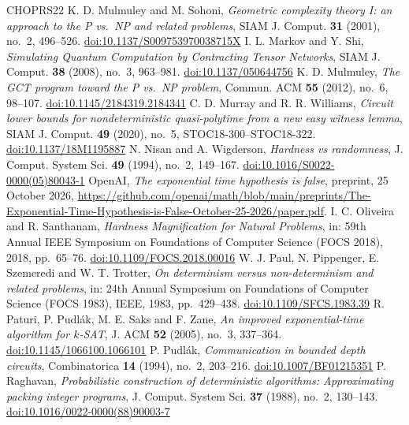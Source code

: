 \documentclass[11pt,reqno]{amsart}
\numberwithin{equation}{section}
\theoremstyle{plain}
\theoremstyle{definition}
\theoremstyle{remark}
\begin{document}
\begin{thebibliography}{CHOPRS22}
 K. D. Mulmuley and M. Sohoni, \emph{Geometric complexity theory I: an approach to the P vs.\ NP and related problems}, SIAM J. Comput. \textbf{31} (2001), no.~2, 496--526. \href{https://doi.org/10.1137/S009753970038715X}{doi:10.1137/S009753970038715X}
 I. L. Markov and Y. Shi, \emph{Simulating Quantum Computation by Contracting Tensor Networks}, SIAM J. Comput. \textbf{38} (2008), no.~3, 963--981. \href{https://doi.org/10.1137/050644756}{doi:10.1137/050644756}
 K. D. Mulmuley, \emph{The GCT program toward the P vs.\ NP problem}, Commun. ACM \textbf{55} (2012), no.~6, 98--107. \href{https://doi.org/10.1145/2184319.2184341}{doi:10.1145/2184319.2184341}
 C. D. Murray and R. R. Williams, \emph{Circuit lower bounds for nondeterministic quasi-polytime from a new easy witness lemma}, SIAM J. Comput. \textbf{49} (2020), no.~5, STOC18-300--STOC18-322. \href{https://doi.org/10.1137/18M1195887}{doi:10.1137/18M1195887}
 N. Nisan and A. Wigderson, \emph{Hardness vs randomness}, J. Comput. System Sci. \textbf{49} (1994), no.~2, 149--167. \href{https://doi.org/10.1016/S0022-0000(05)80043-1}{doi:10.1016/S0022-0000(05)80043-1}
 OpenAI, \emph{The exponential time hypothesis is false}, preprint, 25 October 2026, \url{https://github.com/openai/math/blob/main/preprints/The-Exponential-Time-Hypothesis-is-False-October-25-2026/paper.pdf}.
 I. C. Oliveira and R. Santhanam, \emph{Hardness Magnification for Natural Problems}, in: 59th Annual IEEE Symposium on Foundations of Computer Science (FOCS 2018), 2018, pp.~65--76. \href{https://doi.org/10.1109/FOCS.2018.00016}{doi:10.1109/FOCS.2018.00016}
 W. J. Paul, N. Pippenger, E. Szemeredi and W. T. Trotter, \emph{On determinism versus non-determinism and related problems}, in: 24th Annual Symposium on Foundations of Computer Science (FOCS 1983), IEEE, 1983, pp.~429--438. \href{https://doi.org/10.1109/SFCS.1983.39}{doi:10.1109/SFCS.1983.39}
 R. Paturi, P. Pudl{\'a}k, M. E. Saks and F. Zane, \emph{An improved exponential-time algorithm for $k$-SAT}, J. ACM \textbf{52} (2005), no.~3, 337--364. \href{https://doi.org/10.1145/1066100.1066101}{doi:10.1145/1066100.1066101}
 P. Pudl{\'a}k, \emph{Communication in bounded depth circuits}, Combinatorica \textbf{14} (1994), no.~2, 203--216. \href{https://doi.org/10.1007/BF01215351}{doi:10.1007/BF01215351}
 P. Raghavan, \emph{Probabilistic construction of deterministic algorithms: Approximating packing integer programs}, J. Comput. System Sci. \textbf{37} (1988), no.~2, 130--143. \href{https://doi.org/10.1016/0022-0000(88)90003-7}{doi:10.1016/0022-0000(88)90003-7}

\end{thebibliography}
\end{document}
